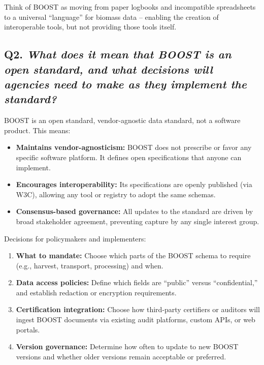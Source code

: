 \documentclass[title=small,preset=opensansnote,par=skip]{article}
\begin{document}
Think of BOOST as moving from paper logbooks and incompatible spreadsheets to a universal “language” for biomass data -- enabling the creation of interoperable tools, but not providing those tools itself.
\subsection{Q2. \emph{What does it mean that BOOST is an open standard, and what decisions will agencies need to make as they implement the standard?}}
\label{sec:org0719416}

BOOST is an open standard, vendor-agnostic data standard, not a software product. This means:

\begin{itemize}
\item \textbf{Maintains vendor-agnosticism:} BOOST does not prescribe or favor any specific software platform. It defines open specifications that anyone can implement.

\item \textbf{Encourages interoperability:} Its specifications are openly published (via W3C), allowing any tool or registry to adopt the same schemas.

\item \textbf{Consensus-based governance:} All updates to the standard are driven by broad stakeholder agreement, preventing capture by any single interest group.
\end{itemize}

Decisions for policymakers and implementers:

\begin{enumerate}
\item \textbf{What to mandate:} Choose which parts of the BOOST schema to require (e.g., harvest, transport, processing) and when.

\item \textbf{Data access policies:} Define which fields are “public” versus “confidential,” and establish redaction or encryption requirements.

\item \textbf{Certification integration:} Choose how third-party certifiers or auditors will ingest BOOST documents via existing audit platforms, custom APIs, or web portals.

\item \textbf{Version governance:} Determine how often to update to new BOOST versions and whether older versions remain acceptable or preferred.
\end{enumerate}
\end{document}
